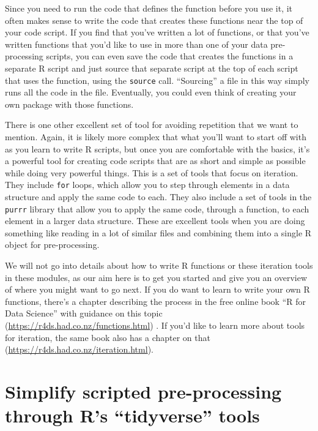 \documentclass[]{tufte-book}
\begin{document}
Since you need to run the code that defines the function before you use it, it
often makes sense to write the code that creates these functions near the top of
your code script. If you find that you've written a lot of functions, or that
you've written functions that you'd like to use in more than one of your data
pre-processing scripts, you can even save the code that creates the functions in
a separate R script and just source that separate script at the top of each
script that uses the function, using the \texttt{source} call. ``Sourcing'' a file in
this way simply runs all the code in the file. Eventually, you could
even think of creating your own package with those functions.

There is one other excellent set of tool for avoiding repetition that we want to
mention. Again, it is likely more complex that what you'll want to start off
with as you learn to write R scripts, but once you are comfortable with the
basics, it's a powerful tool for creating code scripts that are as short and
simple as possible while doing very powerful things. This is a set of tools that
focus on iteration. They include \texttt{for} loops, which allow you to step through
elements in a data structure and apply the same code to each. They also include
a set of tools in the \texttt{purrr} library that allow you to apply the same code,
through a function, to each element in a larger data structure. These are
excellent tools when you are doing something like reading in a lot of similar
files and combining them into a single R object for pre-processing.

We will not go into details about how to write R functions or these iteration
tools in these modules, as our aim here is to get you started and give you an
overview of where you might want to go next. If you do want to learn to write
your own R functions, there's a chapter describing the process in the free
online book ``R for Data Science'' with guidance on this topic
(\url{https://r4ds.had.co.nz/functions.html}) \citep{wickham2016r}. If you'd like to learn
more about tools for iteration, the same book also has a chapter on that
(\url{https://r4ds.had.co.nz/iteration.html}).

\section{Simplify scripted pre-processing through R's ``tidyverse'' tools}\label{module14}
\end{document}
